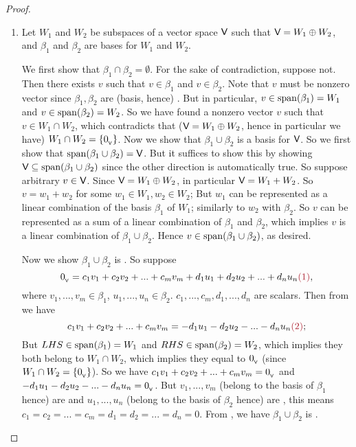 \begin{proof} \ 
\begin{enumerate}
\item
Let \(W_1\) and \(W_2\) be subspaces of a vector space \(\textsf{V}\) such that \(\textsf{V} = W_1 \oplus W_2\), and \(\beta_1\) and \(\beta_2\) are bases for \(W_1\) and \(W_2\).

We first show that \(\beta_1 \cap \beta_2 = \emptyset\).
For the sake of contradiction, suppose not.
Then there exists \(v\) such that \(v \in \beta_1\) and \(v \in \beta_2\).
Note that \(v\) must be nonzero vector since \(\beta_1, \beta_2\) are (basis, hence) \LID{}.
But in particular, \(v \in \operatorname{span}(\beta_1) = W_1\) and \(v \in \operatorname{span}(\beta_2) = W_2\).
So we have found a nonzero vector \(v\) such that \(v \in W_1 \cap W_2\), which contradicts that (\(\textsf{V} = W_1 \oplus W_2\), hence in particular we have) \(W_1 \cap W_2 = \{ 0_{_{\textsf{V}}} \}\).
Now we show that \(\beta_1 \cup \beta_2\) is a basis for \(\textsf{V}\).
So we first show that \(\operatorname{span}(\beta_1 \cup \beta_2) = \textsf{V}\).
But it suffices to show this by showing \(\textsf{V} \subseteq \operatorname{span}(\beta_1 \cup \beta_2)\) since the other direction is automatically true.
So suppose arbitrary \(v \in \textsf{V}\).
Since \(\textsf{V} = W_1 \oplus W_2\), in particular \(\textsf{V} = W_1 + W_2\).
So \(v = w_1 + w_2\) for some \(w_1 \in W_1, w_2 \in W_2\);
But \(w_1\) can be represented as a linear combination of the basis \(\beta_1\) of \(W_1\); similarly to \(w_2\) with \(\beta_2\).
So \(v\) can be represented as a sum of a linear combination of \(\beta_1\) and \(\beta_2\), which implies \(v\) is a linear combination of \(\beta_1 \cup \beta_2\).
Hence \(v \in \operatorname{span}(\beta_1 \cup \beta_2)\), as desired.

Now we show \(\beta_1 \cup \beta_2\) is \LID{}.
So suppose
\[
    \OV = c_1 v_1 + c_2 v_2 + ... + c_m v_m + d_1 u_1 + d_2 u_2 + ... + d_n u_n ,
\]
where \(v_1, ..., v_m \in \beta_1\), \(u_1, ..., u_n \in \beta_2\). \(c_1, ..., c_m, d_1, ..., d_n\) are scalars.
Then from \MAROON{(1)} we have
\[
    c_1 v_1 + c_2 v_2 + ... + c_m v_m = - d_1 u_1 - d_2 u_2 - ... - d_n u_n \MAROON{(2)};
\]
But \(LHS \in \operatorname{span}(\beta_1) = W_1\) and \(RHS \in \operatorname{span}(\beta_2) = W_2\), which implies they both belong to \(W_1 \cap W_2\), which implies they equal to \(0_{_{\textsf{V}}}\) (since \(W_1 \cap W_2 = \{ 0_{_{\textsf{V}}} \}\)).
So we have \(c_1 v_1 + c_2 v_2 + ... + c_m v_m = 0_{_{\textsf{V}}}\) and \(- d_1 u_1 - d_2 u_2 - ... - d_n u_n = 0_{_{\textsf{V}}}\).
But \(v_1, ..., v_m\) (belong to the basis of \(\beta_1\) hence) are \LID{} and \(u_1, ..., u_n\) (belong to the basis of \(\beta_2\) hence) are \LID{}, this means \(c_1 = c_2 = ... = c_m = d_1 = d_2 = ... = d_n = 0\).
From \MAROON{(1)}, we have \(\beta_1 \cup \beta_2\) is \LID{}.


\end{enumerate}
\end{proof}
